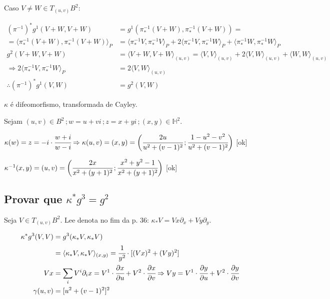 \documentclass[10pt,a4paper]{article}
\begin{document}
		\vspace{3mm}

		Caso $V \ne W \in T_{(u,v)}B^2$:

		\begin{align*}
		{(\pi^{-1})}^* g^1(V + W, V + W) &= g^1(\pi^{-1}_* (V + W), \pi^{-1}_* (V + W)) = \\
		= \langle \pi_*^{-1} (V + W), \pi_*^{-1} (V + W) \rangle_P &= \langle \pi_*^{-1} V, \pi_*^{-1} V \rangle_P + 2 \langle \pi_*^{-1} V, \pi_*^{-1} W \rangle_P + \langle \pi_*^{-1} W, \pi_*^{-1} W \rangle_P \\
		g^2(V + W, V + W) &= \langle V + W, V + W \rangle_{(u,v)} = \langle V, V \rangle_{(u,v)} + 2 \langle V, W \rangle_{(u,v)} + \langle W, W \rangle_{(u,v)} \\
		\Rightarrow 2 \langle \pi_*^{-1} V, \pi_*^{-1} W \rangle_P &= 2 \langle V, W \rangle_{(u,v)} \\
		\therefore {(\pi^{-1})}^* g^1(V, W) &= g^2(V, W)
		\end{align*}

		\vspace{3mm}

		$\kappa$ \'e difeomorfismo, transformada de Cayley.

		Sejam $(u, v) \in B^2\,; w = u + vi\,; z = x + yi\,; (x, y) \in \mathbb{H}^2$.

		$\kappa(w) = z = -i \cdot \cfrac{w + i}{w - i} \Rightarrow \kappa(u,v) = (x,y) = \bigg( \cfrac{2u}{u^2 + (v-1)^2} \,; \cfrac{1 - u^2 - v^2}{u^2 + (v-1)^2}  \bigg)$ [ok]

		$\kappa^{-1}(x,y) = (u,v) = \bigg( \cfrac{2x}{x^2 + (y+1)^2} \,; \cfrac{x^2 + y^2 - 1}{x^2 + (y+1)^2}  \bigg)$ [ok]

		\vspace{120mm}

		\subsection{Provar que $\kappa^* g^3 = g^2$}

		\begin{flushright}
		\end{flushright}

		Seja $V \in T_{(u,v)}B^2$. Lee denota no fim da p. 36: $\kappa_* V = Vx \partial_x + Vy \partial_y$.

		\begin{align*}
		\kappa^* g^3(V,V) &= g^3(\kappa_* V, \kappa_* V) \\
		&= \langle \kappa_* V, \kappa_* V\rangle_{(x,y)} = \cfrac{1}{y^2} \cdot [(Vx)^2 + (Vy)^2] \\
		Vx &= \sum_i V^i \partial_i x = V^1 \cdot \cfrac{\partial x}{\partial u} + V^2 \cdot \cfrac{\partial x}{\partial v} \Rightarrow Vy = V^1 \cdot \cfrac{\partial y}{\partial u} + V^2 \cdot \cfrac{\partial y}{\partial v} \\
		\gamma(u,v) &= [u^2 + (v-1)^2]^2
		\end{align*}
\end{document}
